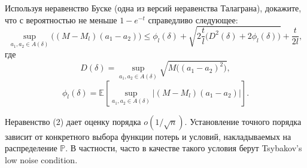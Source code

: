 \begin{problem}
Используя неравенство Буске (одна из версий неравенства Талаграна), докажите, что с вероятностью не меньше $1 - e^{-t}$ справедливо следующее:
\[
\tag{2}
\sup_{a_1, a_2 \in A(\delta)} \bigl( (M - M_l)(a_1- a_2)\bigr)
\leqslant
\phi_l(\delta) + \sqrt{
2\frac{t}{l}\bigl( D^2(\delta) + 2\phi_l(\delta)\bigr)
}
+\frac{t}{2l},
\]
где
\[
D(\delta) = \sup_{a_1, a_2 \in A(\delta)} \sqrt{M\bigl( (a_1 - a_2)^2\bigr)}, \] \[
\phi_l(\delta) = \mathbb{E} \left[\sup_{a_1, a_2 \in A(\delta)} \left| (M - M_l)(a_1 - a_2) \right|\right].
\]

\begin{remark}
Неравенство (2) дает оценку порядка $o(1/\sqrt{n})$.
Установление точного порядка зависит от конкретного выбора функции потерь и условий, накладываемых на распределение $\mathbb{P}$. В частности, часто в качестве такого условия берут Tsybakov's low noise condition. 
\end{remark}
\end{problem}